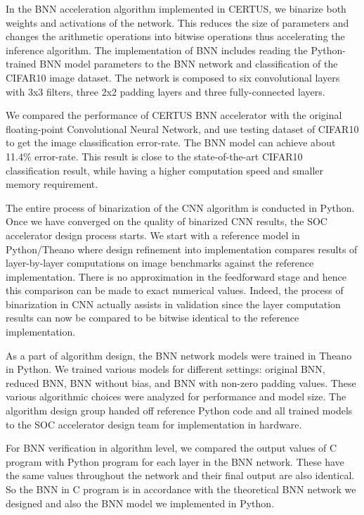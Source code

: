 In the BNN acceleration algorithm implemented in CERTUS, we binarize both
weights and activations of the network. This reduces the size of
parameters and changes the arithmetic operations into bitwise operations
thus accelerating the inference algorithm. The implementation of BNN
includes reading the Python-trained BNN model parameters to the BNN
network and classification of the CIFAR10 image dataset. The network is
composed to six convolutional layers with 3x3 filters, three 2x2 padding
layers and three fully-connected layers.

We compared the performance of CERTUS BNN accelerator with the original
floating-point Convolutional Neural Network, and use testing dataset of
CIFAR10 to get the image classification error-rate. The BNN model can
achieve about 11.4\% error-rate. This result is close to the
state-of-the-art CIFAR10 classification result, while having a higher
computation speed and smaller memory requirement.


The entire process of binarization of the CNN algorithm is conducted in
Python. Once we have converged on the quality of binarized CNN results,
the SOC accelerator design process starts. We start with a reference
model in Python/Theano where design refinement into implementation
compares results of layer-by-layer computations on image benchmarks
against the reference implementation. There is no approximation in the
feedforward stage and hence this comparison can be made to exact
numerical values. Indeed, the process of binarization in CNN actually
assists in validation since the layer computation results can now be
compared to be bitwise identical to the reference implementation.

As a part of algorithm design, the BNN network models were trained in
Theano in Python. We trained various models for different settings:
original BNN, reduced BNN, BNN without bias, and BNN with non-zero
padding values. These various algorithmic choices were analyzed for
performance and model size. The algorithm design group handed off
reference Python code and all trained models to the SOC accelerator
design team for implementation in hardware.

For BNN verification in algorithm level, we compared the output values of
C program with Python program for each layer in the BNN network. These
have the same values throughout the network and their final output are
also identical. So the BNN in C program is in accordance with the
theoretical BNN network we designed and also the BNN model we implemented
in Python.

